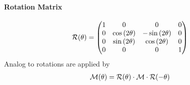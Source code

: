 \paragraph{Rotation Matrix}
\begin{align}
\mathcal{R}(\theta)=
\begin{split}
\begin{pmatrix}
    1 &                0 &               0 & 0 \\
    0 & \cos{(2\theta)} & -\sin{(2\theta)} & 0 \\
    0 & \sin{(2\theta)} & \cos{(2\theta)} & 0 \\
    0 &                0 &               0 & 1
  \end{pmatrix}
\end{split}
\end{align}
% 
Analog to \dummy{} rotations are applied by
\begin{align}
\mathcal{M}(\theta )=\mathcal{R}(\theta )\cdot\mathcal{M}\cdot\mathcal{R}(-\theta )
\end{align}
% 
% 
